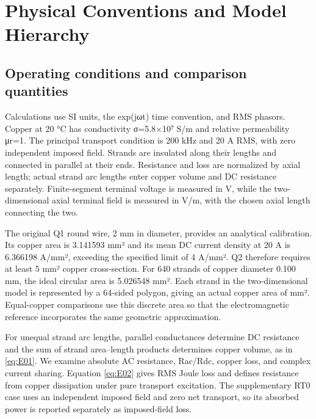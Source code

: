 \section{Physical Conventions and Model Hierarchy}
\label{chapter:02}

\hypertarget{02.conventions.heading}{}
\subsection{Operating conditions and comparison quantities}

\hypertarget{02.conventions.p1}{}
Calculations use SI units, the exp(jωt) time convention, and RMS phasors. Copper at 20 °C has conductivity σ=5.8×10⁷ S/m and relative permeability μr=1. The principal transport condition is 200 kHz and 20 A RMS, with zero independent imposed field. Strands are insulated along their lengths and connected in parallel at their ends. Resistance and loss are normalized by axial length; actual strand arc lengths enter copper volume and DC resistance separately. Finite-segment terminal voltage is measured in V, while the two-dimensional axial terminal field is measured in V/m, with the chosen axial length connecting the two.

\hypertarget{02.conventions.p2}{}
The original Q1 round wire, 2 mm in diameter, provides an analytical calibration. Its copper area is 3.141593 mm² and its mean DC current density at 20 A is 6.366198 A/mm², exceeding the specified limit of 4 A/mm². Q2 therefore requires at least 5 mm² copper cross-section. For 640 strands of copper diameter 0.100 mm, the ideal circular area is 5.026548 mm². Each strand in the two-dimensional model is represented by a 64-sided polygon, giving an actual copper area of  mm². Equal-copper comparisons use this discrete area so that the electromagnetic reference incorporates the same geometric approximation.

\hypertarget{02.conventions.p3}{}
For unequal strand arc lengths, parallel conductances determine DC resistance and the sum of strand area–length products determines copper volume, as in \eqref{eq:E01}. We examine absolute AC resistance, Rac/Rdc, copper loss, and complex current sharing. Equation \eqref{eq:E02} gives RMS Joule loss and defines resistance from copper dissipation under pure transport excitation. The supplementary RT0 case uses an independent imposed field and zero net transport, so its absorbed power is reported separately as imposed-field loss.

